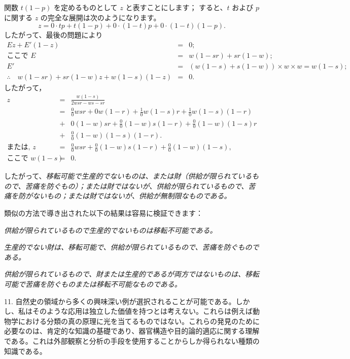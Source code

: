 \documentclass[a4paper,11pt,openany]{ltjsbook}
\begin{document}
関数 $t(1-p)$ を定めるものとして $z$ と表すことにします；
すると、$t$ および $p$ に関する $z$ の完全な展開は次のようになります。
\[
z = 0 \cdot tp + t (1 - p) + 0 \cdot (1 - t) p + 0 \cdot (1 - t) (1 - p).
\]
したがって、最後の問題により
\begin{eqnarray*}
E z + E' (1 - z) &=& 0;\\
\textrm{ここで } E &=& w (1 - sr) + sr (1 - w);\\
E' &=& \left( w (1 - s) + s (1 - w) \right) \times w \times w = w (1 - s); \\
\therefore \quad w (1 - sr) + sr (1 - w) z + w (1 - s) (1 - z) &=& 0.
\end{eqnarray*}
したがって，
\begin{eqnarray*}
z &=& \frac{w (1 - s)}{2wsr - ws - sr}\\
&=& \frac{0}{0} wsr + 0 w(1 - r) + \frac{1}{0} w(1 - s)r + \frac{1}{0} w(1 - s)(1 - r)\\
&+& 0 (1 - w) sr + \frac{0}{0} (1 - w)s(1 - r) + \frac{0}{0} (1 - w)(1 - s)r \\
&+& \frac{0}{0} (1 - w)(1 - s)(1 - r).\\
\textrm{または, } z &=& \frac{0}{0} wsr + \frac{0}{0} (1 - w)s(1 - r) + \frac{0}{0} (1 - w)(1 - s), \\
\textrm{ここで } w (1 - s) &=& 0.
\end{eqnarray*}

したがって、\textit{移転可能で生産的でないものは、または財（供給が限られているもので、苦痛を防ぐもの）；または財ではないが、供給が限られているもので、苦痛を防がないもの；または財ではないが、供給が無制限なものである。}

類似の方法で導き出された以下の結果は容易に検証できます：

\textit{供給が限られているもので生産的でないものは移転不可能である。}

\textit{生産的でない財は、移転可能で、供給が限られているもので、苦痛を防ぐものである。}

\textit{供給が限られているもので、財または生産的であるが両方ではないものは、移転可能で苦痛を防ぐものまたは移転不可能なものである。}

11. 自然史の領域から多くの興味深い例が選択されることが可能である。しかし、私はそのような応用は独立した価値を持つとは考えない。これらは例えば動物学における分類の真の原理に光を当てるものではない。これらの発見のために必要なのは、肯定的な知識の基礎であり、器官構造や目的論的適応に関する理解である。これは外部観察と分析の手段を使用することからしか得られない種類の知識である。
\end{document}
